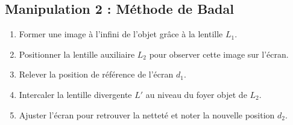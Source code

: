 \subsection{Manipulation 2 : Méthode de Badal}
\begin{enumerate}
    \item Former une image à l'infini de l'objet grâce à la lentille $L_1$.
    \item Positionner la lentille auxiliaire $L_2$ pour observer cette image sur l'écran.
    \item Relever la position de référence de l'écran $d_1$.
    \item Intercaler la lentille divergente $L'$ au niveau du foyer objet de $L_2$.
    \item Ajuster l'écran pour retrouver la netteté et noter la nouvelle position $d_2$.
\end{enumerate}
